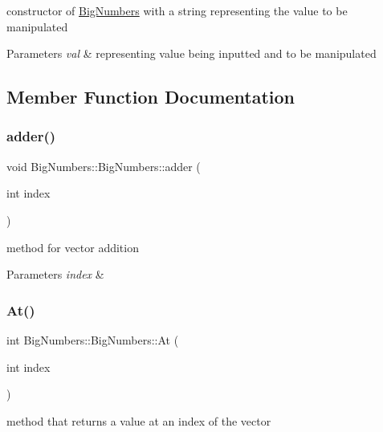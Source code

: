 constructor of \mbox{\hyperlink{class_big_numbers_1_1_big_numbers}{Big\+Numbers}} with a string representing the value to be manipulated 
\begin{DoxyParams}{Parameters}
{\em val} & representing value being inputted and to be manipulated \\
\hline
\end{DoxyParams}


\subsection{Member Function Documentation}
\mbox{\label{class_big_numbers_1_1_big_numbers_af2221d705797b836d5043aaaa0f8774f}} 
\subsubsection{\texorpdfstring{adder()}{adder()}}
{\footnotesize\ttfamily void Big\+Numbers\+::\+Big\+Numbers\+::adder (\begin{DoxyParamCaption}\item[{int}]{index }\end{DoxyParamCaption})}



method for vector addition 


\begin{DoxyParams}{Parameters}
{\em index} & \\
\hline
\end{DoxyParams}
\mbox{\label{class_big_numbers_1_1_big_numbers_a8c08fae9001723b23352a48440bd212e}} 
\subsubsection{\texorpdfstring{At()}{At()}}
{\footnotesize\ttfamily int Big\+Numbers\+::\+Big\+Numbers\+::\+At (\begin{DoxyParamCaption}\item[{int}]{index }\end{DoxyParamCaption})}



method that returns a value at an index of the vector 


